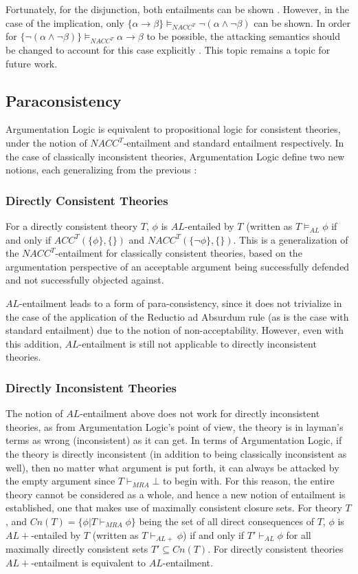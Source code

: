 \documentclass[11pt,twoside,a4paper]{report}
\begin{document}
Fortunately, for the disjunction, both entailments can be shown \citep*[pp. 11-12]{alpaper}. However, in the case of the implication, only $\{\alpha\rightarrow\beta\}\models_{NACC^T}\neg(\alpha\wedge\neg\beta)$ can be shown. In order for $\{\neg(\alpha\wedge\neg\beta)\}\models_{NACC^T}\alpha\rightarrow\beta$ to be possible, the attacking semantics should be changed to account for this case explicitly \citep*[pp. 12-13]{alpaper}. This topic remains a topic for future work.

\subsection{Paraconsistency}
Argumentation Logic is equivalent to propositional logic for consistent theories, under the notion of $NACC^T$-entailment and standard entailment respectively. In the case of classically inconsistent theories, Argumentation Logic define two new notions, each generalizing from the previous \citep*[pp. 13-15]{alpaper}:

\subsubsection{Directly Consistent Theories}
For a directly consistent theory $T$, $\phi$ is $AL$-entailed by $T$ (written as $T\models_{AL}\phi$ if and only if $ACC^T(\{\phi\},\{\})$ and $NACC^T(\{\neg\phi\},\{\})$. This is a generalization of the $NACC^T$-entailment for classically consistent theories, based on the argumentation perspective of an acceptable argument being successfully defended and not successfully objected against.

$AL$-entailment leads to a form of para-consistency, since it does not trivialize in the case of the application of the Reductio ad Absurdum rule (as is the case with standard entailment) due to the notion of non-acceptability. However, even with this addition, $AL$-entailment is still not applicable to directly inconsistent theories.

\subsubsection{Directly Inconsistent Theories}
The notion of $AL$-entailment above does not work for directly inconsistent theories, as from Argumentation Logic's point of view, the theory is in layman's terms as wrong (inconsistent) as it can get. In terms of Argumentation Logic, if the theory is directly inconsistent (in addition to being classically inconsistent as well), then no matter what argument is put forth, it can always be attacked by the empty argument since $T\vdash_{MRA}\bot$ to begin with. 
For this reason, the entire theory cannot be considered as a whole, and hence a new notion of entailment is established, one that makes use of maximally consistent closure sets. For theory $T$, and $Cn(T) = \{\phi| T\vdash_{MRA}\phi\}$ being the set of all direct consequences of $T$, $\phi$ is $AL+$-entailed by $T$ (written as $T\vdash_{AL+}\phi$) if and only if $T'\vdash_{AL}\phi$ for all maximally directly consistent sets $T'\subseteq Cn(T)$. For directly consistent theories $AL+$-entailment is equivalent to $AL$-entailment. 
\end{document}
